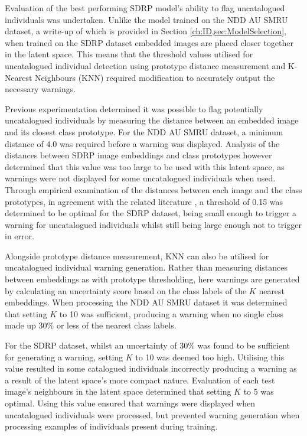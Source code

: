 Evaluation of the best performing SDRP model's ability to flag uncatalogued individuals was undertaken. Unlike the model trained on the NDD AU SMRU dataset, a write-up of which is provided in Section \ref{ch:ID,sec:ModelSelection}, when trained on the SDRP dataset embedded images are placed closer together in the latent space. This means that the threshold values utilised for uncatalogued individual detection using prototype distance measurement and K-Nearest Neighbours (KNN) required modification to accurately output the necessary warnings. 

Previous experimentation determined it was possible to flag potentially uncatalogued individuals by measuring the distance between an embedded image and its closest class prototype. For the NDD AU SMRU dataset, a minimum distance of 4.0 was required before a warning was displayed. Analysis of the distances between SDRP image embeddings and class prototypes however determined that this value was too large to be used with this latent space, as warnings were not displayed for some uncatalogued individuals when used. Through empirical examination of the distances between each image and the class prototypes, in agreement with the related literature \cite{battle_siamese_2022}, a threshold of 0.15 was determined to be optimal for the SDRP dataset, being small enough to trigger a warning for uncatalogued individuals whilst still being large enough not to trigger in error.

Alongside prototype distance measurement, KNN can also be utilised for uncatalogued individual warning generation. Rather than measuring distances between embeddings as with prototype thresholding, here warnings are generated by calculating an uncertainty score based on the class labels of the $K$ nearest embeddings. When processing the NDD AU SMRU dataset it was determined that setting $K$ to 10 was sufficient, producing a warning when no single class made up 30\% or less of the nearest class labels. 

For the SDRP dataset, whilst an uncertainty of 30\% was found to be sufficient for generating a warning, setting $K$ to 10 was deemed too high. Utilising this value resulted in some catalogued individuals incorrectly producing a warning as a result of the latent space's more compact nature. Evaluation of each test image's neighbours in the latent space determined that setting $K$ to 5 was optimal. Using this value ensured that warnings were displayed when uncatalogued individuals were processed, but prevented warning generation when processing examples of individuals present during training. 

